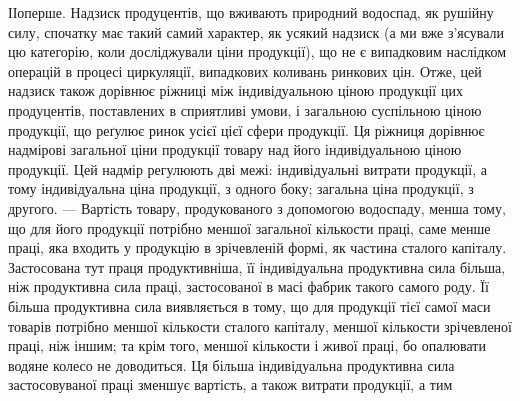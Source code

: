 ІІоперше. Надзиск продуцентів, що вживають природний водоспад, як
рушійну силу, спочатку має такий самий характер, як усякий надзиск (а ми
вже з’ясували цю категорію, коли досліджували ціни продукції), що не є
випадковим наслідком операцій в процесі циркуляції, випадкових коливань ринкових
цін. Отже, цей надзиск також дорівнює ріжниці між індивідуальною ціною продукції
цих продуцентів, поставлених в сприятливі умови, і загальною суспільною ціною
продукції, що реґулює ринок усієї цієї сфери продукції. Ця ріжниця дорівнює
надмірові загальної ціни продукції товару над його індивідуальною ціною продукції.
Цей надмір регулюють дві межі: індивідуальні витрати продукції, а тому
індивідуальна ціна продукції, з одного боку; загальна ціна продукції, з другого. —
Вартість товару, продукованого з допомогою водоспаду, менша тому, що для
його продукції потрібно меншої загальної кількости праці, саме менше праці, яка
входить у продукцію в зрічевленій формі, як частина сталого капіталу. Застосована
тут праця продуктивніша, її індивідуальна продуктивна сила більша,
ніж продуктивна сила праці, застосованої в масі фабрик такого самого роду.
Її більша продуктивна сила виявляється в тому, що для продукції тієї самої
маси товарів потрібно меншої кількости сталого капіталу, меншої кількости
зрічевленої праці, ніж іншим; та крім того, меншої кількости і живої праці,
бо опалювати водяне колесо не доводиться. Ця більша індивідуальна продуктивна
сила застосовуваної праці зменшує вартість, а також витрати продукції, а тим
